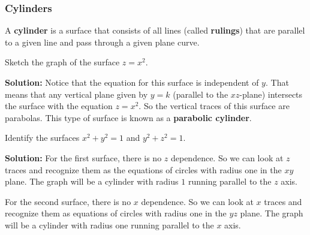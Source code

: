 \subsubsection{Cylinders}
A \textbf{cylinder} is a surface that consists of all lines (called \textbf{rulings}) that are parallel to a given line and pass through a given plane curve.
\begin{example}
    Sketch the graph of the surface \(z=x^2\).\par\textbf{Solution:} Notice that the equation for this surface is independent of \(y\). That means that any vertical plane given by \(y=k\) (parallel to the \(xz\)-plane) intersects the surface with the equation \(z=x^2\). So the vertical traces of this surface are parabolas. This type of surface is known as a \textbf{parabolic cylinder}.
    \begin{figure}[!h]
        \centering
    \end{figure}
\end{example}
\begin{example}
    Identify the surfaces
    \(x^2+y^2=1\)
    and \(y^2+z^2=1.\)\par \textbf{Solution: }For the first surface, there is no \(z\) dependence. So we can look at \(z\) traces and recognize them as the equations of circles with radius one in the \(xy\) plane. The graph will be a cylinder with radius \(1\) running parallel to the \(z\) axis. \par
    For the second surface, there is no \(x\) dependence. So we can look at \(x\) traces and recognize them as equations of circles with radius one in the \(yz\) plane. The graph will be a cylinder with radius one running parallel to the \(x\) axis.
\end{example}
